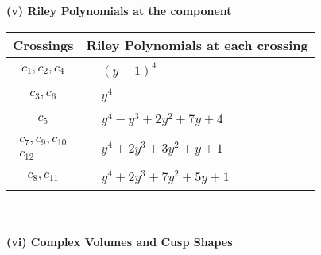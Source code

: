 \documentclass[1p]{elsarticle_modified}
\theoremstyle{definition}
\begin{document}
\newpage\renewcommand{\arraystretch}{1}
\flushleft \textbf{(v) Riley Polynomials at the component}\newline \\
\begin{tabular}{m{50pt}|m{274pt}}
Crossings & \hspace{64pt}Riley Polynomials at each crossing \\
\hline $$\begin{aligned}c_{1},c_{2},c_{4}\end{aligned}$$&$\begin{aligned}
&(y-1)^4
\end{aligned}$\\
\hline $$\begin{aligned}c_{3},c_{6}\end{aligned}$$&$\begin{aligned}
&y^4
\end{aligned}$\\
\hline $$\begin{aligned}c_{5}\end{aligned}$$&$\begin{aligned}
&y^4- y^3+2 y^2+7 y+4
\end{aligned}$\\
\hline $$\begin{aligned}c_{7},c_{9},c_{10}\\c_{12}\end{aligned}$$&$\begin{aligned}
&y^4+2 y^3+3 y^2+y+1
\end{aligned}$\\
\hline $$\begin{aligned}c_{8},c_{11}\end{aligned}$$&$\begin{aligned}
&y^4+2 y^3+7 y^2+5 y+1
\end{aligned}$\\
\hline
\end{tabular}\\~\\
\newpage\flushleft \textbf{(vi) Complex Volumes and Cusp Shapes}
\end{document}

